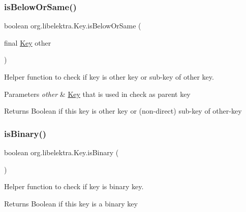 \subsubsection{\texorpdfstring{isBelowOrSame()}{isBelowOrSame()}}
{\footnotesize\ttfamily boolean org.\+libelektra.\+Key.\+is\+Below\+Or\+Same (\begin{DoxyParamCaption}\item[{final \mbox{\hyperlink{classorg_1_1libelektra_1_1Key}{Key}}}]{other }\end{DoxyParamCaption})\hspace{0.3cm}{\ttfamily [inline]}}



Helper function to check if key is other key or sub-\/key of other key. 


\begin{DoxyParams}{Parameters}
{\em other} & \mbox{\hyperlink{classorg_1_1libelektra_1_1Key}{Key}} that is used in check as parent key \\
\hline
\end{DoxyParams}
\begin{DoxyReturn}{Returns}
Boolean if this key is other key or (non-\/direct) sub-\/key of other-\/key 
\end{DoxyReturn}
\mbox{\label{classorg_1_1libelektra_1_1Key_a2323fd06287eac6343ed60756f3cc9c1}} 
\subsubsection{\texorpdfstring{isBinary()}{isBinary()}}
{\footnotesize\ttfamily boolean org.\+libelektra.\+Key.\+is\+Binary (\begin{DoxyParamCaption}{ }\end{DoxyParamCaption})\hspace{0.3cm}{\ttfamily [inline]}}



Helper function to check if key is binary key. 

\begin{DoxyReturn}{Returns}
Boolean if this key is a binary key 
\end{DoxyReturn}
\mbox{\label{classorg_1_1libelektra_1_1Key_a799b0577d5e1491702e45566c943bda4}} 

